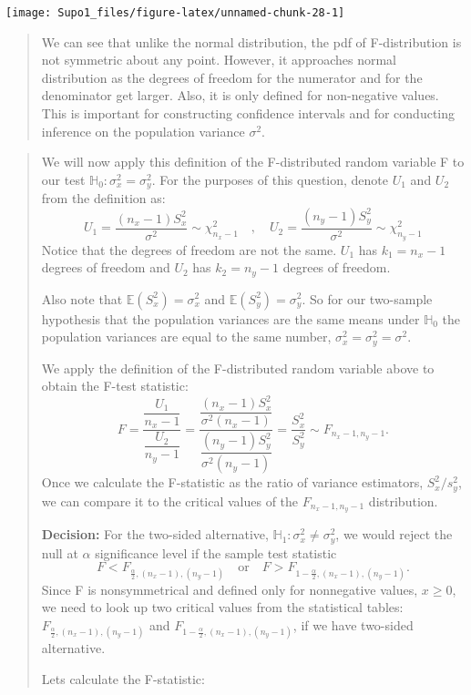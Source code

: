 \documentclass[
]{article}
\begin{document}
\begin{center}\texttt{[image: Supo1\_files/figure-latex/unnamed-chunk-28-1]} \end{center}

\begin{quote}
We can see that unlike the normal distribution, the pdf of
F-distribution is not symmetric about any point. However, it approaches
normal distribution as the degrees of freedom for the numerator and for
the denominator get larger. Also, it is only defined for non-negative
values. This is important for constructing confidence intervals and for
conducting inference on the population variance \(\sigma^2.\)
\end{quote}

\begin{quote}
We will now apply this definition of the F-distributed random variable F
to our test \(\mathbb{H}_0:\sigma_x^2 = \sigma_y^2.\) For the purposes
of this question, denote \(U_1\) and \(U_2\) from the definition as: \[
U_1 = \frac{(n_x-1)S_x^2}{\sigma^2} \sim \chi_{n_x-1}^2 \quad , \quad 
U_2 = \frac{(n_y-1)S_y^2}{\sigma^2} \sim \chi_{n_y-1}^2
\] Notice that the degrees of freedom are not the same. \(U_1\) has
\(k_1=n_x-1\) degrees of freedom and \(U_2\) has \(k_2=n_y-1\) degrees
of freedom.

Also note that \(\mathbb{E}(S_x^2)=\sigma_x^2\) and
\(\mathbb{E}(S_y^2)=\sigma_y^2.\) So for our two-sample hypothesis that
the population variances are the same means under \(\mathbb{H}_0\) the
population variances are equal to the same number,
\(\sigma_x^2 = \sigma_y^2 = \sigma^2.\)

We apply the definition of the F-distributed random variable above to
obtain the F-test statistic: \[
F = \frac{\dfrac{U_1}{n_x-1}}{\dfrac{U_2}{n_y-1}} 
= \frac{\dfrac{(n_x-1)S_x^2}{\sigma^2(n_x-1)}}{\dfrac{(n_y-1)S_y^2}{\sigma^2(n_y-1)}}
= \frac{S_x^2}{S_y^2}
\sim F_{n_x-1,n_y-1}.
\] Once we calculate the F-statistic as the ratio of variance
estimators, \(S_x^2/s_y^2\), we can compare it to the critical values of
the \(F_{n_x-1,n_y-1}\) distribution.

\textbf{Decision:} For the two-sided alternative,
\(\mathbb{H}_1:\sigma_x^2 \neq \sigma_y^2\), we would reject the null at
\(\alpha\) significance level if the sample test statistic \[
F < F_{\frac{\alpha}{2}, (n_x-1), (n_y-1)} \quad
\text{or} \quad
F > F_{1-\frac{\alpha}{2}, (n_x-1), (n_y-1)}.
\] Since F is nonsymmetrical and defined only for nonnegative values,
\(x\ge 0\), we need to look up two critical values from the statistical
tables: \(F_{\frac{\alpha}{2}, (n_x-1), (n_y-1)}\) and
\(F_{1-\frac{\alpha}{2}, (n_x-1), (n_y-1)}\), if we have two-sided
alternative.

Lets calculate the F-statistic:
\end{quote}
\end{document}
